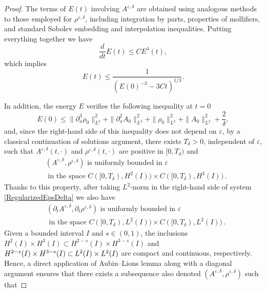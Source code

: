 \documentclass[12pt]{amsart}
\begin{document}
\begin{proof}
            
The terms of $E(t)$ involving $A^{\varepsilon,\delta}$ are obtained using analogous methods to those employed for $\rho^{\varepsilon,\delta}$, including integration by parts, properties of mollifiers, and standard Sobolev embedding and interpolation inequalities. Putting everything together we have
    \begin{equation*}
        \frac{d}{dt}E(t)\leq CE^4(t),
    \end{equation*}
    which implies
    \begin{equation}\label{EnergyEstimate}
        E(t)\leq \frac{1}{\left( E(0)^{-3}-3Ct\right)^{1/3}}.
    \end{equation}

    In addition, the energy $E$ verifies the following inequality at $t=0$
    \begin{equation*}
        E(0)\leq \|\partial_x^3 \rho_0\|_{L^2}^2+\|\partial_x^2A_0\|_{L^2}^2 +\|\rho_0\|^2_{L^2}+\|A_0\|^2_{L^2}+\frac{2}{\delta},
    \end{equation*}
    and, since the right-hand side of this  inequality does not depend on $\varepsilon$, by a classical continuation of solutions argument, there exists $T_\delta>0$, independent of $\varepsilon$, such that $A^{\varepsilon,\delta}(t,\cdot)$ and $\rho^{\varepsilon,\delta}(t,\cdot)$ are positive in $[0,T_\delta)$ and
    \begin{equation*}\label{UniformlyBounded}
        \begin{split}
        &(A^{\varepsilon,\delta},\rho^{\varepsilon,\delta}) \text{ is uniformly bounded in } \varepsilon\\ &\text{ in the space } C([0,T_\delta),H^2(I))\times C([0,T_\delta),H^3(I))\,.
        \end{split}
    \end{equation*}
    Thanks to this property, after taking $L^2$-norm in the right-hand side of system \eqref{RegularizedEpsDelta} we also have
    \begin{equation*}
        \begin{split}
        &(\partial_t A^{\varepsilon,\delta},\partial_t\rho^{\varepsilon,\delta}) \text{ is uniformly bounded in } \varepsilon \\&\text{ in the space } C([0,T_\delta),L^2(I))\times C([0,T_\delta),L^2(I))\,.
        \end{split}
    \end{equation*}
    Given a  bounded interval $I$ and $s\in(0,1)$, the inclusions $H^2(I)\times H^3(I)\subset H^{2-s}(I)\times H^{3-s}(I)$ and $H^{2-s}(I)\times H^{3-s}(I)\subset\hspace{-0.02cm} L^2(I)\times L^2(I)$ are compact and continuous, respectively. Hence, a direct application of Aubin--Lions lemma along with a diagonal argument ensures that there exists a subsequence also denoted  $(A^{\varepsilon,\delta},\rho^{\varepsilon,\delta})$ such that

\end{proof}
\end{document}
